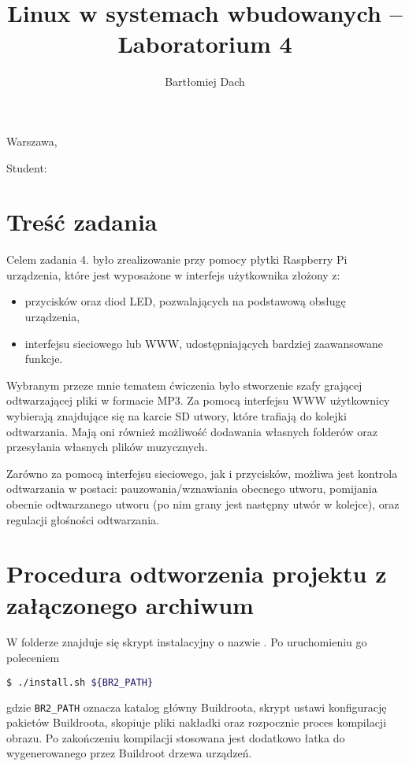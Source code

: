 \documentclass[10pt,a4paper]{article}
\title{Linux w systemach wbudowanych -- Laboratorium 4}
\author{Bartłomiej Dach}
\begin{document}
\makeatletter
\begin{flushright}
	Warszawa, \@date
\end{flushright}
\begin{center}
	\LARGE{\@title}
\end{center}
\vspace{0.25cm}
Student: \@author
\makeatother

\section{Treść zadania}

Celem zadania 4. było zrealizowanie przy pomocy płytki Raspberry Pi urządzenia, które jest
wyposażone w interfejs użytkownika złożony z:

\begin{itemize}
	\item przycisków oraz diod LED, pozwalających na podstawową obsługę urządzenia,
	\item interfejsu sieciowego lub WWW, udostępniających bardziej zaawansowane funkcje.
\end{itemize}

Wybranym przeze mnie tematem ćwiczenia było stworzenie szafy grającej odtwarzającej pliki
w formacie MP3. Za pomocą interfejsu WWW użytkownicy wybierają znajdujące się na karcie SD
utwory, które trafiają do kolejki odtwarzania. Mają oni również możliwość dodawania
własnych folderów oraz przesyłania własnych plików muzycznych.

Zarówno za pomocą interfejsu sieciowego, jak i przycisków, możliwa jest kontrola odtwarzania
w postaci: pauzowania/wznawiania obecnego utworu, pomijania obecnie odtwarzanego utworu
(po nim grany jest następny utwór w kolejce), oraz regulacji głośności odtwarzania.

\section{Procedura odtworzenia projektu z załączonego archiwum}

W folderze  znajduje się skrypt instalacyjny o nazwie .
Po uruchomieniu go poleceniem
\begin{lstlisting}[language=bash]
$ ./install.sh ${BR2_PATH}
\end{lstlisting}
gdzie \texttt{BR2\_PATH} oznacza katalog główny Buildroota, skrypt ustawi konfigurację pakietów
Buildroota, skopiuje pliki nakładki oraz rozpocznie proces kompilacji obrazu. Po zakończeniu
kompilacji stosowana jest dodatkowo łatka do wygenerowanego przez Buildroot drzewa urządzeń.
\end{document}
